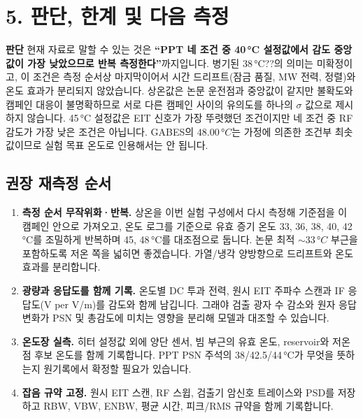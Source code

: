 \documentclass[10pt,a4paper]{article}
\newcommand{\summarybox}[1]{%
  \noindent\colorbox{pale}{%
    \parbox{\dimexpr\textwidth-2\fboxsep\relax}{#1}}}
\providecommand{\SensitivityOptimumTemperatureC}{48.00}
\providecommand{\PaperPSNOptimumC}{33}
\begin{document}
\section*{5. 판단, 한계 및 다음 측정}

\summarybox{%
\textbf{\color{navy}판단}\quad
현재 자료로 말할 수 있는 것은 \textbf{``PPT 네 조건 중 40\,°C 설정값에서 감도 중앙값이 가장 낮았으므로
반복 측정한다''}까지입니다. 병기된 38\,°C??의 의미는 미확정이고, 이 조건은 측정 순서상 마지막이어서
시간 드리프트(잠금 품질, MW 전력, 정렬)와 온도 효과가 분리되지 않았습니다. 상온값은 논문 운전점과
중앙값이 같지만 불확도와 캠페인 대응이 불명확하므로 서로 다른 캠페인 사이의 유의도를 하나의
\(\sigma\) 값으로 제시하지 않습니다. 45\,°C 설정값은 EIT 신호가 가장 뚜렷했던 조건이지만 네 조건 중
RF 감도가 가장 낮은 조건은 아닙니다. GABES의 \(\SensitivityOptimumTemperatureC\,°C\)는 가정에 의존한
조건부 최솟값이므로 실험 목표 온도로 인용해서는 안 됩니다.}

\subsection*{권장 재측정 순서}

\begin{enumerate}
  \setlength{\itemsep}{0.22em}
  \item \textbf{측정 순서 무작위화·반복.} 상온을 이번 실험 구성에서 다시 측정해 기준점을 이 캠페인 안으로
        가져오고, 온도 로그를 기준으로 유효 증기 온도 33, 36, 38, 40, 42\,°C를 조밀하게 반복하며
        45, 48\,°C를 대조점으로 둡니다.
        논문 최적 \(\sim\PaperPSNOptimumC\,°C\) 부근을 포함하도록 저온 쪽을 넓히면 좋겠습니다.
        가열/냉각 양방향으로 드리프트와 온도 효과를 분리합니다.
  \item \textbf{광량과 응답도를 함께 기록.} 온도별 DC 투과 전력, 원시 EIT 주파수 스캔과
        IF 응답도(V per V/m)를 감도와 함께 남깁니다. 그래야 검출 광자 수 감소와 원자 응답 변화가
        PSN 및 총감도에 미치는 영향을 분리해 모델과 대조할 수 있습니다.
  \item \textbf{온도장 실측.} 히터 설정값 외에 양단 센서, 빔 부근의 유효 온도,
        reservoir와 저온점 후보 온도를 함께 기록합니다. PPT PSN 주석의 38/42.5/44\,°C가 무엇을 뜻하는지
        원기록에서 확정할 필요가 있습니다.
  \item \textbf{잡음 규약 고정.} 원시 EIT 스캔, RF 스윕, 검출기 암신호 트레이스와 PSD를 저장하고
        RBW, VBW, ENBW, 평균 시간, 피크/RMS 규약을 함께 기록합니다.
\end{enumerate}
\end{document}

